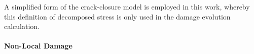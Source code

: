 \documentclass[sn-mathphys,Numbered]{sn-jnl}%
\begin{document}
A simplified form of the crack-closure model \cite{teixeira_ductile_2010} is employed in this work, whereby this definition of decomposed stress is only used in the damage evolution calculation. 






\paragraph{Non-Local Damage}

\end{document}
